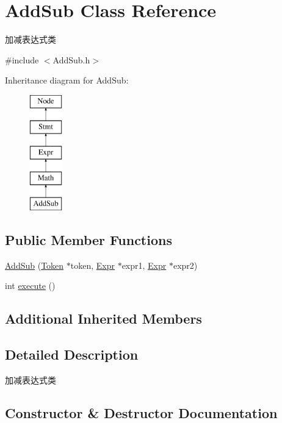 \hypertarget{class_add_sub}{}\section{Add\+Sub Class Reference}
\label{class_add_sub}


加减表达式类  




{\ttfamily \#include $<$Add\+Sub.\+h$>$}

Inheritance diagram for Add\+Sub\+:\begin{figure}[H]
\begin{center}
\leavevmode
\includegraphics[height=5.000000cm]{class_add_sub}
\end{center}
\end{figure}
\subsection*{Public Member Functions}
\begin{DoxyCompactItemize}
\item 
\hyperlink{class_add_sub_af090ec4bb8a06ee586c4bfa8f4bad3ef}{Add\+Sub} (\hyperlink{class_token}{Token} $\ast$token, \hyperlink{class_expr}{Expr} $\ast$expr1, \hyperlink{class_expr}{Expr} $\ast$expr2)
\item 
int \hyperlink{class_add_sub_a73c0513a31a5400fdfc79ce877a1c3b9}{execute} ()
\end{DoxyCompactItemize}
\subsection*{Additional Inherited Members}


\subsection{Detailed Description}
加减表达式类 

\subsection{Constructor \& Destructor Documentation}
\mbox{\label{class_add_sub_af090ec4bb8a06ee586c4bfa8f4bad3ef}} 

